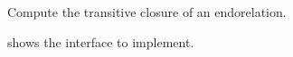 




\begin{codeexercise}
    Compute the transitive closure of an endorelation.

     shows the interface to implement.
\end{codeexercise}


